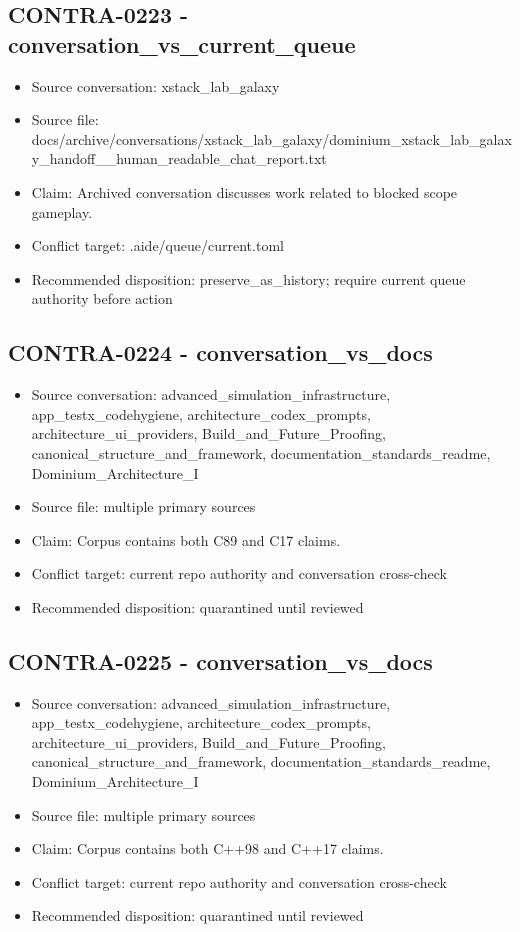 \documentclass[11pt,a4paper]{report}
\begin{document}
\subsection{CONTRA-0223 - conversation\_vs\_current\_queue}

\begin{itemize}
\item Source conversation: xstack\_lab\_galaxy
\item Source file: docs/archive/conversations/xstack\_lab\_galaxy/dominium\_xstack\_lab\_galaxy\_handoff\_\_human\_readable\_chat\_report.txt
\item Claim: Archived conversation discusses work related to blocked scope gameplay.
\item Conflict target: .aide/queue/current.toml
\item Recommended disposition: preserve\_as\_history; require current queue authority before action
\end{itemize}

\subsection{CONTRA-0224 - conversation\_vs\_docs}

\begin{itemize}
\item Source conversation: advanced\_simulation\_infrastructure, app\_testx\_codehygiene, architecture\_codex\_prompts, architecture\_ui\_providers, Build\_and\_Future\_Proofing, canonical\_structure\_and\_framework, documentation\_standards\_readme, Dominium\_Architecture\_I
\item Source file: multiple primary sources
\item Claim: Corpus contains both C89 and C17 claims.
\item Conflict target: current repo authority and conversation cross-check
\item Recommended disposition: quarantined until reviewed
\end{itemize}

\subsection{CONTRA-0225 - conversation\_vs\_docs}

\begin{itemize}
\item Source conversation: advanced\_simulation\_infrastructure, app\_testx\_codehygiene, architecture\_codex\_prompts, architecture\_ui\_providers, Build\_and\_Future\_Proofing, canonical\_structure\_and\_framework, documentation\_standards\_readme, Dominium\_Architecture\_I
\item Source file: multiple primary sources
\item Claim: Corpus contains both C++98 and C++17 claims.
\item Conflict target: current repo authority and conversation cross-check
\item Recommended disposition: quarantined until reviewed
\end{itemize}
\end{document}
